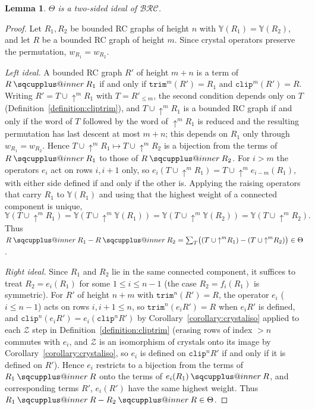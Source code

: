\documentclass{amsart}
\makeatletter
\newcommand{\sqcupplus@inner}[2]{%
  \vcenter{\hbox{\ooalign{%
    \hfil$\m@th#1\sqcup$\hfil\cr
    \hfil\raisebox{0.15ex}{$\m@th#1\scriptscriptstyle+$}\hfil\cr
  }}}%
}
\newcommand{\sqcupplus}{\mathbin{\mathpalette\sqcupplus@inner\relax}}
\newtheorem{lemma}{Lemma}[subsection]
\theoremstyle{definition}
\theoremstyle{remark}
\numberwithin{equation}{subsection}
\newcommand{\shup}{{\uparrow}}
\newcommand{\wof}[1]{w_{#1}}
\newcommand{\trm}{\mathtt{trim}}
\newcommand{\zeromap}{\mathcal{Z}}
\newcommand{\clp}{\mathtt{clip}}
\newcommand{\BRC}{\mathcal{BRC}}
\makeatother
\begin{document}
\begin{lemma}\label{lemma:thetaideal}
  $\Theta$ is a two-sided ideal of $\BRC$.
\end{lemma}
\begin{proof}
Let $R_1,R_2$ be bounded RC graphs of height $n$ with $\mathbb{Y}(R_1)=\mathbb{Y}(R_2)$, and let $R$ be a bounded RC graph of height $m$. Since crystal operators preserve the permutation, $\wof{R_1}=\wof{R_2}$.

\emph{Left ideal.} A bounded RC graph $R'$ of height $m+n$ is a term of $R\sqcupplus R_1$ if and only if $\trm^m(R')=R_1$ and $\clp^m(R')=R$. Writing $R'=T\cup\shup^mR_1$ with $T=R'_{\leq m}$, the second condition depends only on $T$ (Definition~\ref{definition:cliptrim}), and $T\cup\shup^mR_1$ is a bounded RC graph if and only if the word of $T$ followed by the word of $\shup^m R_1$ is reduced and the resulting permutation has last descent at most $m+n$; this depends on $R_1$ only through $\wof{R_1}=\wof{R_2}$. Hence $T\cup\shup^mR_1\mapsto T\cup\shup^mR_2$ is a bijection from the terms of $R\sqcupplus R_1$ to those of $R\sqcupplus R_2$. For $i>m$ the operators $e_i$ act on rows $i,i+1$ only, so $e_i(T\cup\shup^mR_1)=T\cup\shup^me_{i-m}(R_1)$, with either side defined if and only if the other is. Applying the raising operators that carry $R_1$ to $\mathbb{Y}(R_1)$ and using that the highest weight of a connected component is unique,
$$\mathbb{Y}(T\cup\shup^mR_1)=\mathbb{Y}(T\cup\shup^m\mathbb{Y}(R_1))=\mathbb{Y}(T\cup\shup^m\mathbb{Y}(R_2))=\mathbb{Y}(T\cup\shup^mR_2)\text{.}$$
Thus $R\sqcupplus R_1-R\sqcupplus R_2=\sum_T\bigl((T\cup\shup^mR_1)-(T\cup\shup^mR_2)\bigr)\in\Theta$.

\emph{Right ideal.} Since $R_1$ and $R_2$ lie in the same connected component, it suffices to treat $R_2=e_i(R_1)$ for some $1\leq i\leq n-1$ (the case $R_2=f_i(R_1)$ is symmetric). For $R'$ of height $n+m$ with $\trm^n(R')=R$, the operator $e_i$ ($i\leq n-1$) acts on rows $i,i+1\leq n$, so $\trm^n(e_iR')=R$ when $e_iR'$ is defined, and $\clp^n(e_iR')=e_i(\clp^nR')$ by Corollary~\ref{corollary:crystaliso} applied to each $\zeromap$ step in Definition~\ref{definition:cliptrim} (erasing rows of index $>n$ commutes with $e_i$, and $\zeromap$ is an isomorphism of crystals onto its image by Corollary~\ref{corollary:crystaliso}, so $e_i$ is defined on $\clp^nR'$ if and only if it is defined on $R'$). Hence $e_i$ restricts to a bijection from the terms of $R_1\sqcupplus R$ onto the terms of $e_i(R_1)\sqcupplus R$, and corresponding terms $R'$, $e_i(R')$ have the same highest weight. Thus $R_1\sqcupplus R-R_2\sqcupplus R\in\Theta$.
\end{proof}
\end{document}
